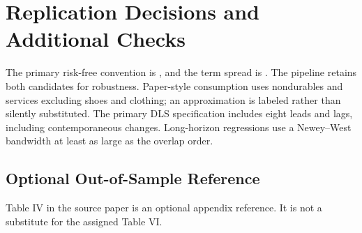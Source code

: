 \section{Replication Decisions and Additional Checks}



The primary risk-free convention is \RiskFreePrimary{}, and the term spread is
\TermSpreadPrimary{}. The pipeline retains both candidates for robustness.
Paper-style consumption uses nondurables and services excluding shoes and
clothing; an approximation is labeled rather than silently substituted. The
primary DLS specification includes eight leads and lags, including
contemporaneous changes. Long-horizon regressions use a Newey--West bandwidth
at least as large as the overlap order.

\subsection{Optional Out-of-Sample Reference}

Table IV in the source paper is an optional appendix reference. It is not a
substitute for the assigned Table VI.
